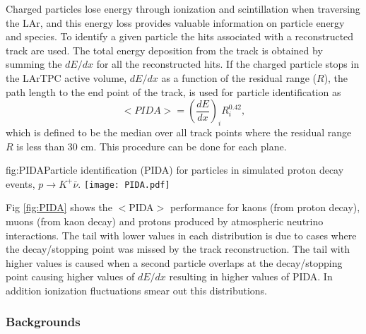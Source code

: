 Charged particles lose energy through ionization and scintillation when traversing the LAr, and this energy loss provides valuable information on particle energy and species. To identify a given particle the hits associated with a reconstructed track are used.
The total energy deposition from the track is obtained by summing the $dE/dx$ for all the reconstructed hits. If the charged particle stops in the LArTPC active volume, $dE/dx$ as a function of the residual range ($R$), the path length to the end point of the track, is used for particle identification as
\begin{equation}
<PIDA >= \left(\frac{dE}{dx}\right)_{i}R^{0.42}_{i}, 
\end{equation}
which is defined to be the median over all track points where the residual range $R$ is less than 30 cm. This procedure can be done for each plane. 

\begin{dunefigure}{fig:PIDA}{Particle identification (PIDA) for particles in simulated proton decay events, $p\rightarrow K^{+} \bar{\nu}$.}
\texttt{[image: PIDA.pdf]}
\end{dunefigure}

Fig \ref{fig:PIDA} shows the $<$PIDA$>$ performance for kaons (from proton decay), muons (from kaon decay) and protons produced by atmospheric neutrino interactions. The tail with lower values in each distribution is due to cases where the decay/stopping point was missed by the track reconstruction. The tail with higher values is caused when a second particle overlaps at the decay/stopping point causing higher values of $dE/dx$ resulting in higher values of PIDA. In addition ionization fluctuations smear out this distributions.

\subsubsection{Backgrounds}

